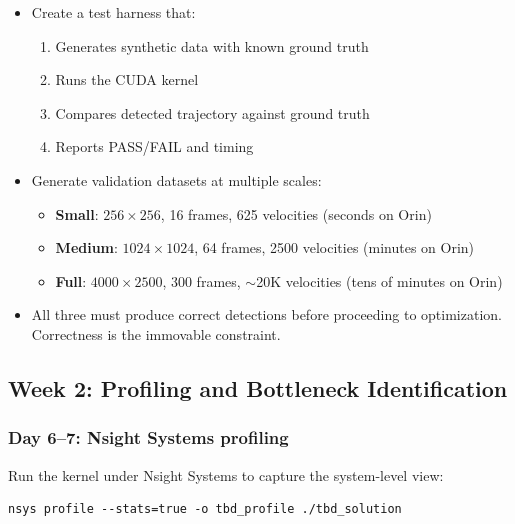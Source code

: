 \documentclass[11pt,letterpaper]{article}
\begin{document}
\begin{itemize}[leftmargin=2em]
    \item Create a test harness that:
    \begin{enumerate}
        \item Generates synthetic data with known ground truth
        \item Runs the CUDA kernel
        \item Compares detected trajectory against ground truth
        \item Reports PASS/FAIL and timing
    \end{enumerate}

    \item Generate validation datasets at multiple scales:
    \begin{itemize}
        \item \textbf{Small}: $256 \times 256$, 16 frames, 625 velocities
            (seconds on Orin)
        \item \textbf{Medium}: $1024 \times 1024$, 64 frames, 2500 velocities
            (minutes on Orin)
        \item \textbf{Full}: $4000 \times 2500$, 300 frames, $\sim$20K
            velocities (tens of minutes on Orin)
    \end{itemize}

    \item All three must produce correct detections before proceeding to
    optimization. Correctness is the immovable constraint.
\end{itemize}

\subsection{Week 2: Profiling and Bottleneck Identification}

\subsubsection{Day 6--7: Nsight Systems profiling}

Run the kernel under Nsight Systems to capture the system-level view:

\begin{lstlisting}[style=bashstyle]
nsys profile --stats=true -o tbd_profile ./tbd_solution
\end{lstlisting}
\end{document}
